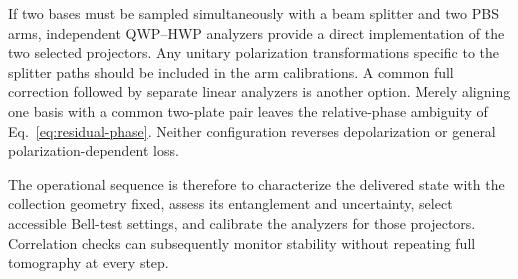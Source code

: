 \documentclass[a4paper,10pt]{article}
\begin{document}
If two bases must be sampled simultaneously with a beam splitter and two
PBS arms, independent QWP--HWP analyzers provide a direct implementation
of the two selected projectors. Any unitary polarization transformations
specific to the splitter paths should be included in the arm calibrations.
A common full correction followed by separate linear analyzers is another
option. Merely aligning one basis with a common two-plate pair leaves
the relative-phase ambiguity of Eq.~\eqref{eq:residual-phase}.
Neither configuration reverses depolarization or general
polarization-dependent loss.

The operational sequence is therefore to characterize the delivered
state with the collection geometry fixed, assess its entanglement and
uncertainty, select accessible Bell-test settings, and calibrate the
analyzers for those projectors. Correlation checks can subsequently
monitor stability without repeating full tomography at every step.



\end{document}
